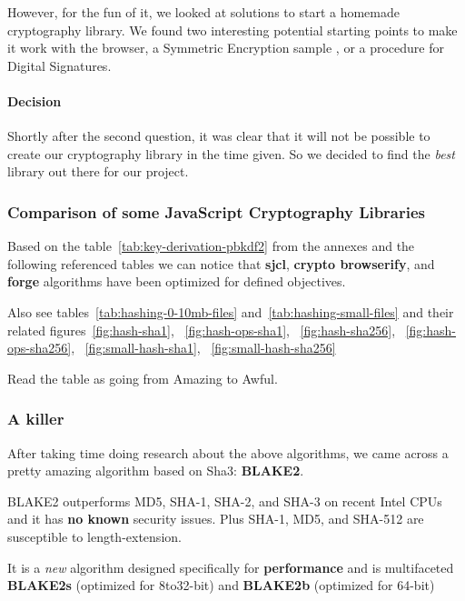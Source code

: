 However, for the fun of it, we looked at solutions to start a homemade cryptography library. We found two interesting potential starting points to make it work with the browser, a Symmetric Encryption sample \cite{InfoTech2014SymmetricSample}, or a procedure for Digital Signatures\cite{InfoTech2014DigitalBrowser}.

\paragraph{Decision} Shortly after the second question, it was clear that it will not be possible to create our cryptography library in the time given. So we decided to find the \textit{best} library out there for our project.

\subsubsection{Comparison of some JavaScript Cryptography Libraries}

Based on the table~\ref{tab:key-derivation-pbkdf2} from the annexes and the following referenced tables we can notice that \textbf{sjcl}\cite{Stark2009SymmetricJavascript}, \textbf{crypto browserify}\cite{Tarr2013Crypto-Browserify}, and \textbf{forge}\cite{DigitalBazaar2016Forge} algorithms have been optimized for defined objectives.

Also see tables~\ref{tab:hashing-0-10mb-files} and~\ref{tab:hashing-small-files}
and their related figures~\ref{fig:hash-sha1}, ~\ref{fig:hash-ops-sha1}, ~\ref{fig:hash-sha256}, ~\ref{fig:hash-ops-sha256}, ~\ref{fig:small-hash-sha1}, ~\ref{fig:small-hash-sha256}

Read the table as going from Amazing to Awful.

\subsubsection{A killer}

After taking time doing research about the above algorithms, we came across a pretty amazing algorithm based on Sha3: \textbf{BLAKE2}\cite{Guo2014AnalysisBLAKE2,SaarinenM-J.2015TheMAC}.

BLAKE2 outperforms MD5, SHA-1, SHA-2, and SHA-3 on recent Intel CPUs and it has \textbf{no known} security issues. Plus SHA-1, MD5, and SHA-512 are susceptible to length-extension.

It is a \textit{new} algorithm designed specifically for \textbf{performance} and is multifaceted \textbf{BLAKE2s} (optimized for 8to32-bit) and \textbf{BLAKE2b} (optimized for 64-bit)

